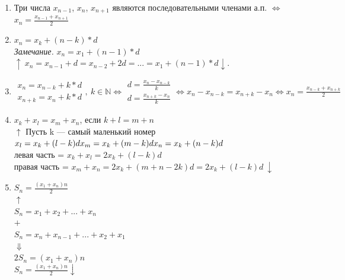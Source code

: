 \documentclass{article}
\begin{document}
    \begin{enumerate}
    	\item Три числа \(x_{n-1}\), \(x_{n}\), \(x_{n+1}\) являются последовательными членами а.п. \(\Leftrightarrow\) \(x_n = \frac{x_{n-1} + x_{n+1}}{2}\)
        \item \(x_n = x_k + (n-k)*d\)\\
        \textit{Замечание.} \(x_n = x_1 + (n-1)*d\)\\
        \(\uparrow\ x_n = x_{n-1} + d = x_{n-2} + 2d = ... = x_1 + (n-1)*d \downarrow\).

        \item \(\begin{aligned}
            x_n = x_{n-k} + k*d \\
            x_{n+k} = x_n + k*d
        \end{aligned}
        ,\ k \in \mathbb{N} \Leftrightarrow 
        \begin{aligned}
            d = \frac{x_n - x_{n-k}}{k} \\
            d = \frac{x_{n+k} - x_n}{k}
        \end{aligned}
        \Leftrightarrow x_n - x_{n-k} = x_{n+k} - x_n \Leftrightarrow x_n = \frac{x_{n-k} + x_{n+k}}{2}\)

		\item \(x_k + x_l = x_m + x_n\), если \(k + l = m + n\)
        \\ \( \uparrow \) Пусть k --- самый маленький номер 
        \\ \(x_l = x_k + (l-k)d\\ x_m = x_k + (m - k)d\\ x_n = x_k + (n-k)d\)
        \\ левая часть = \(x_k + x_l = 2x_k + (l-k)d\)
        \\ правая часть = \(x_m + x_n = 2x_k + (m+n-2k)d = 2x_k + (l-k)d\ \downarrow\)

        \item \(S_n = \frac{(x_1 + x_n)n}{2}\)
        \\ \(\uparrow\) 
        \\ \(S_n = x_1 + x_2 + ... + x_n\)
        \\ \(+\)
        \\ \(S_n = x_n + x_{n-1} + ... + x_2 + x_1\)
        \\ \(\Downarrow\)
        \\ \(2S_n = (x_1 + x_n)n\)
        \\ \(S_n = \frac{(x_1 + x_n)n}{2} \downarrow\)
    \end{enumerate}
    
\end{document}
